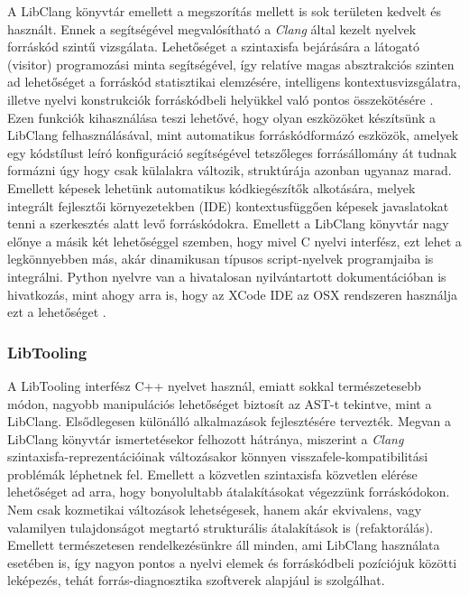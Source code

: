 \documentclass[a4paper,12pt]{report}
\begin{document}
A LibClang könyvtár emellett a megszorítás mellett is sok területen kedvelt és használt. Ennek a segítségével megvalósítható a \emph{Clang} által kezelt nyelvek forráskód szintű vizsgálata. Lehetőséget a szintaxisfa bejárására a látogató (visitor) programozási minta segítségével, így relatíve magas absztrakciós szinten ad lehetőséget a forráskód statisztikai elemzésére, intelligens kontextusvizsgálatra, illetve nyelvi konstrukciók forráskódbeli helyükkel való pontos összekötésére \cite{libclangdocs}. Ezen funkciók kihasználása teszi lehetővé, hogy olyan eszközöket készítsünk a LibClang felhasználásával, mint automatikus forráskódformázó eszközök, amelyek egy kódstílust leíró konfiguráció segítségével tetszőleges forrásállomány át tudnak formázni úgy hogy csak külalakra változik, struktúrája azonban ugyanaz marad. Emellett képesek lehetünk automatikus kódkiegészítők alkotására, melyek integrált fejlesztői környezetekben (IDE) kontextusfüggően képesek javaslatokat tenni a szerkesztés alatt levő forráskódokra. Emellett a LibClang könyvtár nagy előnye a másik két lehetőséggel szemben, hogy mivel C nyelvi interfész, ezt lehet a legkönnyebben más, akár dinamikusan típusos script-nyelvek programjaiba is integrálni. Python nyelvre van a hivatalosan nyilvántartott dokumentációban is hivatkozás, mint ahogy arra is, hogy az XCode IDE az OSX rendszeren használja ezt a lehetőséget \cite{clangtooling}.

\subsubsection{LibTooling}
A LibTooling interfész C++ nyelvet használ, emiatt sokkal természetesebb módon, nagyobb manipulációs lehetőséget biztosít az AST-t tekintve, mint a LibClang. Elsődlegesen különálló alkalmazások fejlesztésére tervezték. Megvan a LibClang könyvtár ismertetésekor felhozott hátránya, miszerint a \emph{Clang} szintaxisfa-reprezentációinak változásakor könnyen visszafele-kompatibilitási problémák léphetnek fel. Emellett a közvetlen szintaxisfa közvetlen elérése lehetőséget ad arra, hogy bonyolultabb átalakításokat végezzünk forráskódokon. Nem csak kozmetikai változások lehetségesek, hanem akár ekvivalens, vagy valamilyen tulajdonságot megtartó strukturális átalakítások is (refaktorálás). Emellett természetesen rendelkezésünkre áll minden, ami LibClang használata esetében is, így nagyon pontos a nyelvi elemek és forráskódbeli pozíciójuk közötti leképezés, tehát forrás-diagnosztika szoftverek alapjául is szolgálhat.
\end{document}
